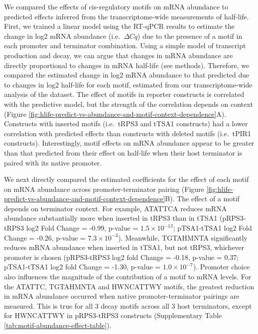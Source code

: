 \documentclass[../main.tex]{subfiles}
\begin{document}
We compared the effects of cis-regulatory motifs on mRNA abundance to predicted effects inferred from the transcriptome-wide measurements of half-life.
First, we trained a linear model using the RT-qPCR results to estimate the change in log2 mRNA abundance (i.e.~\(\Delta Cq\)) due to the presence of a motif in each promoter and terminator combination.
Using a simple model of transcript production and decay, we can argue that changes in mRNA abundance are directly proportional to changes in mRNA half-life (see methods).
Therefore, we compared the estimated change in log2 mRNA abundance to that predicted due to changes in log2 half-life for each motif, estimated from our transcriptome-wide analysis of the \parencite{Chan2018} dataset.
The effect of motifs in reporter constructs is correlated with the predictive model, but the strength of the correlation depends on context (Figure \ref{fig:hlife-predict-vs-abundance-and-motif-context-dependence}A).
Constructs with inserted motifs (i.e.~tRPS3 and tTSA1 constructs) had a lower correlation with predicted effects than constructs with deleted motifs (i.e.~tPIR1 constructs).
Interestingly, motif effects on mRNA abundance appear to be greater than that predicted from their effect on half-life when their host terminator is paired with its native promoter.

We next directly compared the estimated coefficients for the effect of each motif on mRNA abundance across promoter-terminator pairing (Figure \ref{fig:hlife-predict-vs-abundance-and-motif-context-dependence}B).
The effect of a motif depends on terminator context.
For example, ATATTCA reduces mRNA abundance substantially more when inserted in tRPS3 than in tTSA1 (pRPS3-tRPS3 log2 Fold Change = -0.99, p-value = \(1.5 \times 10^{-13}\); pTSA1-tTSA1 log2 Fold Change = -0.26, p-value = \(7.3 \times10^{-3}\)).
Meanwhile, TGTAHMNTA significantly reduces mRNA abundance when inserted in tTSA1, but not tRPS3, whichever promoter is chosen (pRPS3-tRPS3 log2 fold Change = -0.18, p-value = 0.37; pTSA1-tTSA1 log2 fold Change = -1.30, p-value = \(1.0 \times10^{-7}\)).
Promoter choice also influences the magnitude of the contribution of a motif to mRNA levels.
For the ATATTC, TGTAHMNTA and HWNCATTWY motifs, the greatest reduction in mRNA abundance occurred when native promoter-terminator pairings are measured.
This is true for all 3 decay motifs across all 3 host terminators, except for HWNCATTWY in pRPS3-tRPS3 constructs (Supplementary Table \ref{tab:motif-abundance-effect-table}).
\end{document}
